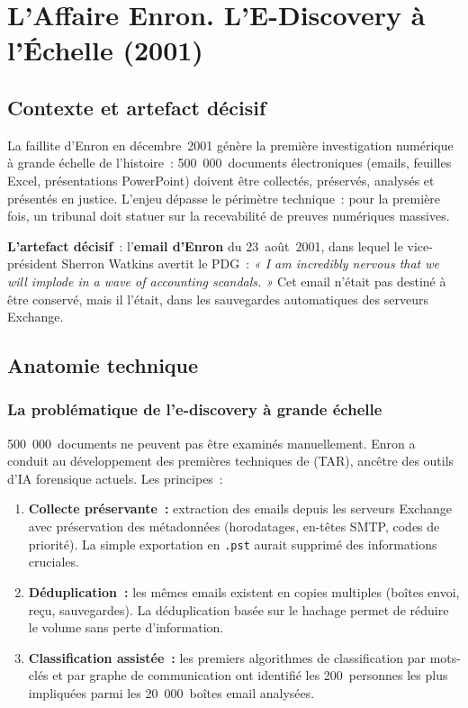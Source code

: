\section{L'Affaire Enron. L'E-Discovery à l'Échelle (2001)}
\label{sec:enron}

\subsection{Contexte et artefact décisif}

La faillite d'Enron en décembre~2001 génère la première investigation
numérique à grande échelle de l'histoire~: 500~000~documents électroniques
(emails, feuilles Excel, présentations PowerPoint) doivent être collectés,
préservés, analysés et présentés en justice. L'enjeu dépasse le périmètre
technique~: pour la première fois, un tribunal doit statuer sur la
recevabilité de preuves numériques massives.

\medskip

\textbf{L'artefact décisif}~: l'\textbf{email d'Enron} du 23~août~2001,
dans lequel le vice-président Sherron Watkins avertit le PDG~: \textit{« I
am incredibly nervous that we will implode in a wave of accounting
scandals. »} Cet email n'était pas destiné à être conservé, mais il
l'était, dans les sauvegardes automatiques des serveurs Exchange.

\subsection{Anatomie technique}

\subsubsection{La problématique de l'e-discovery à grande échelle}

500~000~documents ne peuvent pas être examinés manuellement. Enron a
conduit au développement des premières techniques de
 (TAR), ancêtre des
outils d'IA forensique actuels. Les principes~:

\begin{enumerate}
    \item \textbf{Collecte préservante~:} extraction des emails depuis les
          serveurs Exchange avec préservation des métadonnées (horodatages,
          en-têtes SMTP, codes de priorité). La simple exportation en
          \texttt{.pst} aurait supprimé des informations cruciales.
    \item \textbf{Déduplication~:} les mêmes emails existent en copies
          multiples (boîtes envoi, reçu, sauvegardes). La déduplication
          basée sur le hachage permet de réduire le volume sans perte d'information.
    \item \textbf{Classification assistée~:} les premiers algorithmes de
          classification par mots-clés et par graphe de communication ont
          identifié les 200~personnes les plus impliquées parmi les
          20~000~boîtes email analysées.
\end{enumerate}


